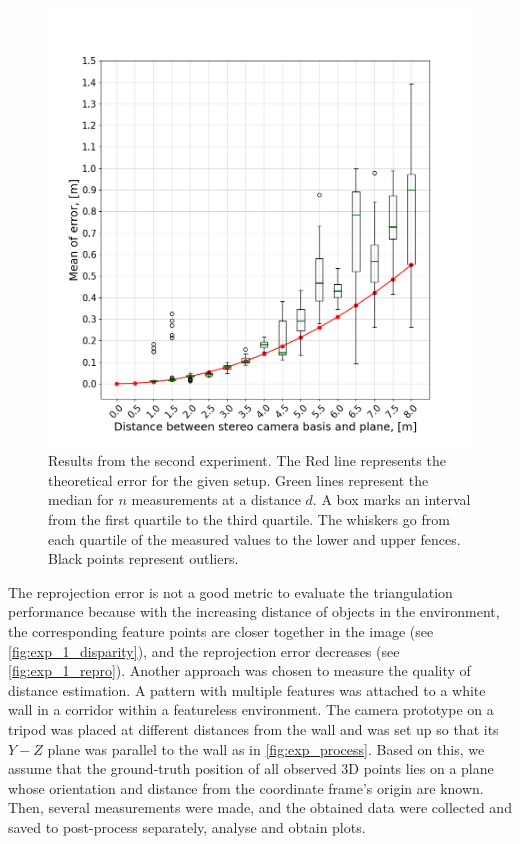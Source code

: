 \begin{figure}[ht]
    \centering
    \includegraphics[width=\textwidth]{graphics/experiment_2_general.png}
    \caption[Results from the second experiment.]{Results from the second experiment.
    The Red line represents the theoretical error for the given setup.
        Green lines represent the median for $n$ measurements at a distance $d$. 
        A box marks an interval from the first quartile to the third quartile.
        The whiskers go from each quartile of the measured values to the lower and upper fences.
        Black points represent outliers.
    }
    \label{fig:exp_2_general}
\end{figure}

The reprojection error is not a good metric to evaluate the triangulation performance because with the increasing distance of objects in the environment, the corresponding feature points are closer together in the image (see \autoref{fig:exp_1_disparity}), and the reprojection error decreases (see \autoref{fig:exp_1_repro}).
Another approach was chosen to measure the quality of distance estimation.
A pattern with multiple features was attached to a white wall in a corridor within a featureless environment.
The camera prototype on a tripod was placed at different distances from the wall and was set up so that its $Y-Z$ plane was parallel to the wall as in \autoref{fig:exp_process}.
Based on this, we assume that the ground-truth position of all observed 3D points lies on a plane whose orientation and distance from the coordinate frame's origin are known.
Then, several measurements were made, and the obtained data were collected and saved to post-process separately, analyse and obtain plots.

